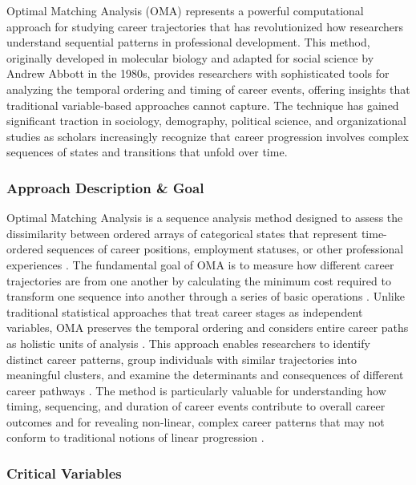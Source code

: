 \documentclass[../main.tex]{subfiles}
\begin{document}
Optimal Matching Analysis (OMA) represents a powerful computational approach for studying career trajectories that has revolutionized how researchers understand sequential patterns in professional development. This method, originally developed in molecular biology and adapted for social science by Andrew Abbott in the 1980s, provides researchers with sophisticated tools for analyzing the temporal ordering and timing of career events, offering insights that traditional variable-based approaches cannot capture. The technique has gained significant traction in sociology, demography, political science, and organizational studies as scholars increasingly recognize that career progression involves complex sequences of states and transitions that unfold over time.

\subsubsection{Approach Description \& Goal}

Optimal Matching Analysis is a sequence analysis method designed to assess the dissimilarity between ordered arrays of categorical states that represent time-ordered sequences of career positions, employment statuses, or other professional experiences \parencite{wikipedia_optimal_matching}. The fundamental goal of OMA is to measure how different career trajectories are from one another by calculating the minimum cost required to transform one sequence into another through a series of basic operations \parencite{wikipedia_optimal_matching}. Unlike traditional statistical approaches that treat career stages as independent variables, OMA preserves the temporal ordering and considers entire career paths as holistic units of analysis \parencite{vannoni_john_career_progression}. This approach enables researchers to identify distinct career patterns, group individuals with similar trajectories into meaningful clusters, and examine the determinants and consequences of different career pathways \parencite{mapping_career_patterns}. The method is particularly valuable for understanding how timing, sequencing, and duration of career events contribute to overall career outcomes and for revealing non-linear, complex career patterns that may not conform to traditional notions of linear progression \parencite{sequence_analysis_social_science}.

\subsubsection{Critical Variables}
\end{document}
